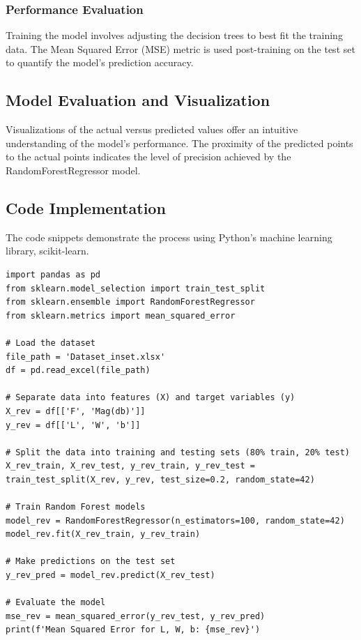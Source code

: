 \documentclass[a4paper,12pt]{report}
\begin{document}
\subsubsection{Performance Evaluation}
Training the model involves adjusting the decision trees to best fit the training data. The Mean Squared Error (MSE) metric is used post-training on the test set to quantify the model's prediction accuracy.

\subsection{Model Evaluation and Visualization}
Visualizations of the actual versus predicted values offer an intuitive understanding of the model's performance. The proximity of the predicted points to the actual points indicates the level of precision achieved by the RandomForestRegressor model.

\subsection{Code Implementation}
The code snippets demonstrate the process using Python's machine learning library, scikit-learn.

\begin{verbatim}
import pandas as pd
from sklearn.model_selection import train_test_split
from sklearn.ensemble import RandomForestRegressor
from sklearn.metrics import mean_squared_error

# Load the dataset
file_path = 'Dataset_inset.xlsx'
df = pd.read_excel(file_path)

# Separate data into features (X) and target variables (y)
X_rev = df[['F', 'Mag(db)']]
y_rev = df[['L', 'W', 'b']]

# Split the data into training and testing sets (80% train, 20% test)
X_rev_train, X_rev_test, y_rev_train, y_rev_test = train_test_split(X_rev, y_rev, test_size=0.2, random_state=42)

# Train Random Forest models
model_rev = RandomForestRegressor(n_estimators=100, random_state=42)
model_rev.fit(X_rev_train, y_rev_train)

# Make predictions on the test set
y_rev_pred = model_rev.predict(X_rev_test)

# Evaluate the model
mse_rev = mean_squared_error(y_rev_test, y_rev_pred)
print(f'Mean Squared Error for L, W, b: {mse_rev}')
\end{verbatim}
\end{document}
